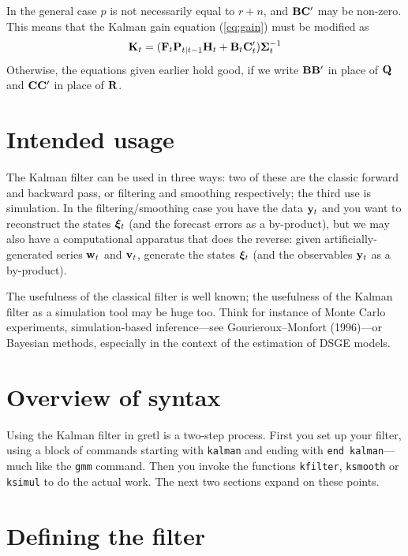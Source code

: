 \documentclass[a4paper]{article}
\newcommand{\obsvec}{\ensuremath\mathbf{y}}
\newcommand{\obsmat}{\ensuremath\mathbf{H}}
\newcommand{\obsdist}{\ensuremath\mathbf{w}}
\newcommand{\obsvar}{\ensuremath\mathbf{R}}
\newcommand{\statevec}{\ensuremath\mathbf{\bm \xi}}
\newcommand{\statemat}{\ensuremath\mathbf{F}}
\newcommand{\strdist}{\ensuremath\mathbf{v}}
\newcommand{\strvar}{\ensuremath\mathbf{Q}}
\newcommand{\statevar}{\ensuremath\mathbf{P}}
\newcommand{\gain}{\ensuremath\mathbf{K}}
\newcommand{\altstrvar}{\ensuremath\mathbf{B}}
\newcommand{\altobsvar}{\ensuremath\mathbf{C}}
\newcommand{\predvar}{\ensuremath{\bm\Sigma}}
\begin{document}
In the general case $p$ is not necessarily equal to $r+n$, and
$\altstrvar \altobsvar'$ may be non-zero.  This means that the
Kalman gain equation (\ref{eq:gain}) must be modified as
%
\begin{equation}
\label{eq:altgain}
\gain_t = (\statemat_t\statevar_{t|t-1}\obsmat_t + \altstrvar_t\altobsvar_t')
  \predvar_t^{-1}
\end{equation}
%
Otherwise, the equations given earlier hold good, if we write
$\altstrvar\altstrvar'$ in place of $\strvar$ and
$\altobsvar\altobsvar'$ in place of $\obsvar$.

\section{Intended usage}

The Kalman filter can be used in three ways: two of these are the
classic forward and backward pass, or filtering and smoothing
respectively; the third use is simulation.  In the
filtering/smoothing case you have the data $\obsvec_t$ and you want to
reconstruct the states $\statevec_t$ (and the forecast errors as a
by-product), but we may also have a computational apparatus that does
the reverse: given artificially-generated series $\obsdist_t$ and
$\strdist_t$, generate the states $\statevec_t$ (and the observables
$\obsvec_t$ as a by-product).

The usefulness of the classical filter is well known; the usefulness
of the Kalman filter as a simulation tool may be huge too. Think for
instance of Monte Carlo experiments, simulation-based inference---see
Gourieroux--Monfort (1996)---or Bayesian methods, especially in the
context of the estimation of DSGE models.

\section{Overview of syntax}

Using the Kalman filter in gretl is a two-step process.  First you set
up your filter, using a block of commands starting with
\texttt{kalman} and ending with \texttt{end kalman}---much like the
\texttt{gmm} command.  Then you invoke the functions \texttt{kfilter},
\texttt{ksmooth} or \texttt{ksimul} to do the actual work.  The next
two sections expand on these points.

\section{Defining the filter}
\end{document}
